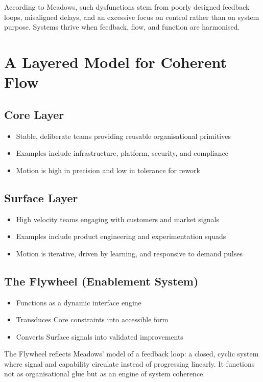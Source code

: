 \documentclass[11pt]{article}
\begin{document}
According to Meadows, such dysfunctions stem from poorly designed feedback loops, misaligned delays, and an excessive focus on control rather than on system purpose. Systems thrive when feedback, flow, and function are harmonised.

\section{A Layered Model for Coherent Flow}
\subsection*{Core Layer}
\begin{itemize}
  \item Stable, deliberate teams providing reusable organisational primitives
  \item Examples include infrastructure, platform, security, and compliance
  \item Motion is high in precision and low in tolerance for rework
\end{itemize}

\subsection*{Surface Layer}
\begin{itemize}
  \item High velocity teams engaging with customers and market signals
  \item Examples include product engineering and experimentation squads
  \item Motion is iterative, driven by learning, and responsive to demand pulses
\end{itemize}

\subsection*{The Flywheel (Enablement System)}
\begin{itemize}
  \item Functions as a dynamic interface engine
  \item Transduces Core constraints into accessible form
  \item Converts Surface signals into validated improvements
\end{itemize}

The Flywheel reflects Meadows' model of a feedback loop: a closed, cyclic system where signal and capability circulate instead of progressing linearly. It functions not as organisational glue but as an engine of system coherence.
\end{document}
